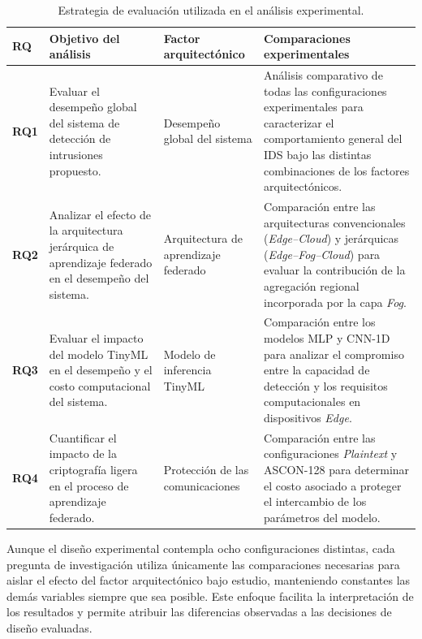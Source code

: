 \documentclass[journal,article,submit,moreauthors]{Definitions/mdpi}
\begin{document}
\begin{table}[ht]
\centering
\caption{Estrategia de evaluación utilizada en el análisis experimental.}
\label{tab:evaluation_strategy}
\footnotesize

\begin{tabularx}{\textwidth}{l p{3.5cm} p{3.5cm} X}
\toprule
\textbf{RQ} &
\textbf{Objetivo del análisis} &
\textbf{Factor arquitectónico} &
\textbf{Comparaciones experimentales} \\
\midrule

\textbf{RQ1} &
Evaluar el desempeño global del sistema de detección de intrusiones propuesto. &
Desempeño global del sistema &
Análisis comparativo de todas las configuraciones experimentales para caracterizar el comportamiento general del IDS bajo las distintas combinaciones de los factores arquitectónicos. \\

\textbf{RQ2} &
Analizar el efecto de la arquitectura jerárquica de aprendizaje federado en el desempeño del sistema. &
Arquitectura de aprendizaje federado &
Comparación entre las arquitecturas convencionales (\textit{Edge--Cloud}) y jerárquicas (\textit{Edge--Fog--Cloud}) para evaluar la contribución de la agregación regional incorporada por la capa \textit{Fog}. \\

\textbf{RQ3} &
Evaluar el impacto del modelo TinyML en el desempeño y el costo computacional del sistema. &
Modelo de inferencia TinyML &
Comparación entre los modelos MLP y CNN-1D para analizar el compromiso entre la capacidad de detección y los requisitos computacionales en dispositivos \textit{Edge}. \\

\textbf{RQ4} &
Cuantificar el impacto de la criptografía ligera en el proceso de aprendizaje federado. &
Protección de las comunicaciones &
Comparación entre las configuraciones \textit{Plaintext} y ASCON-128 para determinar el costo asociado a proteger el intercambio de los parámetros del modelo. \\

\bottomrule
\end{tabularx}

\end{table}

Aunque el diseño experimental contempla ocho configuraciones distintas, cada pregunta de investigación utiliza únicamente las comparaciones necesarias para aislar el efecto del factor arquitectónico bajo estudio, manteniendo constantes las demás variables siempre que sea posible. Este enfoque facilita la interpretación de los resultados y permite atribuir las diferencias observadas a las decisiones de diseño evaluadas.
\end{document}
